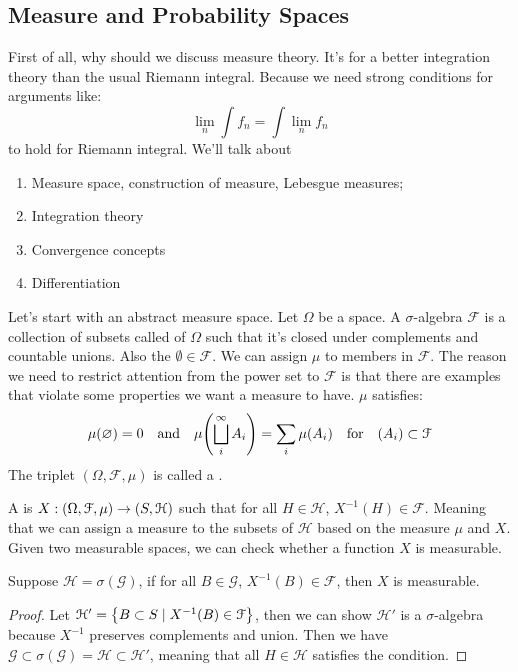 \subsection{Measure and Probability Spaces}
First of all, why should we discuss measure theory. It's for a better integration theory than the usual Riemann integral. Because we need strong conditions for arguments like:
\begin{equation*}
    \lim_{n} \int f_{n} = \int \lim_{n} f_{n}
\end{equation*}
to hold for Riemann integral.  We'll talk about
\begin{enumerate}
    \item Measure space, construction of measure, Lebesgue measures;
    \item Integration theory
    \item Convergence concepts 
    \item Differentiation 
\end{enumerate}

Let's start with an abstract measure space. Let \(\Omega\) be a space. A \(\sigma\)-algebra \(\mathcal{F}\) is a collection of subsets called  of \(\Omega\) such that it's closed under complements and countable unions. Also the \(\emptyset \in \mathcal{F}\). We can assign  \(\mu\) to members in \(\mathcal{F}\). The reason we need to restrict attention from the power set to \(\mathcal{F}\) is that there are examples that violate some properties we want a measure to have. \(\mu\) satisfies:
\begin{equation*}
    \mu\pqty{\emptyset} = 0 \qq{and} \mu \pqty{\sqcup_{i}^{\infty} A_{i}} = \sum_{i} \mu(A_{i}) \qq{for} (A_{i}) \subset \mathcal{F}
\end{equation*}
The triplet \((\Omega, \mathcal{F}, \mu)\) is called a .  

A  is \(X : (\Omega, \mathcal{F}, \mu) \to \pqty{S, \mathcal{H}}\) such that for all \(H \in \mathcal{H}\), \(X^{-1}(H) \in \mathcal{F}\). Meaning that we can assign a measure to the subsets of \(\mathcal{H}\) based on the measure \(\mu\) and \(X\). 
Given two measurable spaces, we can check whether a function \(X\) is measurable. 

\begin{lemma}
    Suppose \(\mathcal{H} = \sigma(\mathcal{G})\), if for all \(B \in \mathcal{G}\), \(X^{-1} (B) \in \mathcal{F}\), then \(X \) is measurable. 
\end{lemma}
\begin{proof}
    Let \(\mathcal{H}' = \Bqty{B\subset S\mid X^{-1}(B) \in \mathcal{F}}\), then we can show \(\mathcal{H}'\) is a \(\sigma\)-algebra because \(X^{-1}\) preserves complements and union. Then we have \(\mathcal{G} \subset \sigma(\mathcal{G}) = \mathcal{H} \subset \mathcal{H}'\), meaning that all \(H\in \mathcal{H}\) satisfies the condition.
\end{proof}

